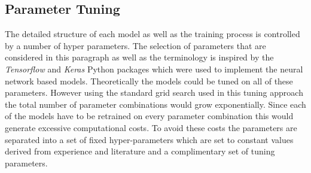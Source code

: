 \subsection{Parameter Tuning}
The detailed structure of each model as well as the training process is controlled by a number of hyper parameters. The selection of parameters that are considered in this paragraph as well as the terminology is inspired by the \textit{Tensorflow} and \textit{Keras} Python packages which were used to implement the neural network based models. Theoretically the models could be tuned on all of these parameters. However using the standard grid search used in this tuning approach the total number of parameter combinations would grow exponentially. Since each of the models have to be retrained on every parameter combination this would generate excessive computational costs. To avoid these costs the parameters are separated into a set of fixed hyper-parameters which are set to constant values derived from experience and literature and a complimentary set of tuning parameters.
